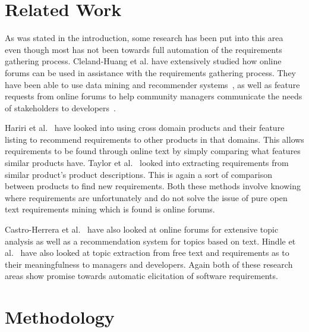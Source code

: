 \documentclass[conference]{IEEEtran}
\begin{document}
\section{Related Work}

As was stated in the introduction, some research has been put into this area~\cite{Ambriola:1997:PNL}
even though most
has not been towards full automation of the requirements gathering process. Cleland-Huang et al.
have extensively studied how online forums can be used in assistance with the requirements gathering
process. They have been able to use data mining and recommender systems~\cite{2008}, as well as
feature requests from online forums to help community managers communicate the needs of stakeholders
to developers~\cite{Cleland-HuangDDC09}.

Hariri et al.~\cite{HaririCMCM13} have looked into using cross domain products and their feature
listing to recommend requirements to other products in that domains. This allows requirements to
be found through online text by simply comparing what features similar products have. Taylor et
al.~\cite{Taylor} looked into extracting requirements from similar product's product descriptions.
This is again a sort of comparison between products to find new requirements. Both these methods
involve knowing where requirements are unfortunately and do not solve the issue of pure 
open text requirements mining which is found is online forums.

Castro-Herrera et al.~\cite{Castro-Herrera:2009:RSD} have also looked at online forums for
extensive topic analysis as well as a recommendation system for topics based on text. Hindle et
al.~\cite{hindle} have also looked at topic extraction from free text and requirements as to
their meaningfulness to managers and developers. Again both of these research areas show promise
towards automatic elicitation of software requirements.

\section{Methodology}
\end{document}
